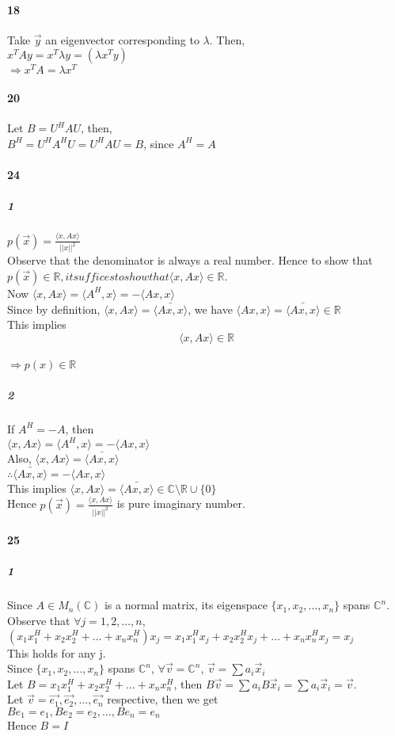 \documentclass[10pt,letter]{article}
\begin{document}
\paragraph{18}
Take $\vec{y}$ an eigenvector corresponding to $\lambda$. Then, \\
$x^TAy=x^T\lambda y=(\lambda x^Ty)$\\
$\Rightarrow x^TA=\lambda x^T$
\paragraph{20}
Let $B=U^HAU$, then,\\
$B^H=U^HA^HU=U^HAU=B$, since $A^H=A$

\paragraph{24}
\subparagraph{1}
$p(\vec{x})=\frac{\langle x,Ax\rangle}{||x||^2}$\\
Observe that the denominator is always a real number. Hence to show that $p(\vec{x})\in \mathbb{R}, it suffices to show that \langle x, Ax\rangle\in\mathbb{R}$. \\
Now $\langle x,Ax\rangle=\langle A^H,x\rangle=-\langle Ax,x\rangle$\\
Since by definition, $\langle x,Ax\rangle=\bar{\langle Ax,x\rangle}$, we have $\langle Ax,x\rangle=\bar{\langle Ax,x\rangle} \in \mathbb{R}$\\
This implies $$\langle x,Ax\rangle \in \mathbb{R}$$\\
$\Rightarrow p(x)\in \mathbb{R}$
\subparagraph{2}
If $A^H=-A$, then \\
$\langle x,Ax\rangle=\langle A^H,x\rangle=-\langle Ax,x\rangle$\\
Also, $\langle x,Ax\rangle=\bar{\langle Ax,x\rangle}$\\
$\therefore \bar{\langle Ax,x\rangle}= -\langle Ax,x\rangle$\\
This implies $\langle x,Ax\rangle=\bar{\langle Ax,x\rangle} \in \mathbb{C}\setminus\mathbb{R} \cup\{0\}$\\
Hence $p(\vec{x})=\frac{\langle x,Ax\rangle}{||x||^2}$ is pure imaginary number. 
\paragraph{25}
\subparagraph{1}
Since $A\in M_n(\mathbb{C})$ is a normal matrix, its eigenspace $\{x_1,x_2,\dots, x_n \}$ spans $\mathbb{C}^n$.\\
Observe that $\forall j=1,2,\dots, n$, \\
$(x_1x_1^H+x_2x_2^H+\dots+x_nx_n^H)x_j=x_1x_1^Hx_j+x_2x_2^Hx_j+\dots+x_nx_n^Hx_j=x_j$\\
This holds for any j.\\ 
Since $\{x_1,x_2,\dots, x_n \}$ spans $\mathbb{C}^n$, $\forall \vec{v}=\mathbb{C}^n$, $\vec{v}=\sum a_i\vec{x}_i$\\
Let $B=x_1x_1^H+x_2x_2^H+\dots+x_nx_n^H$, then $B\vec{v}=\sum a_iB\vec{x}_i=\sum a_i\vec{x}_i=\vec{v}$.\\
Let $\vec{v}=\vec{e_1},\vec{e_2},\dots,\vec{e_n}$ respective, then we get \\
$Be_1=e_1, Be_2=e_2, \dots, Be_n=e_n $\\
Hence $B=I$
\end{document}
